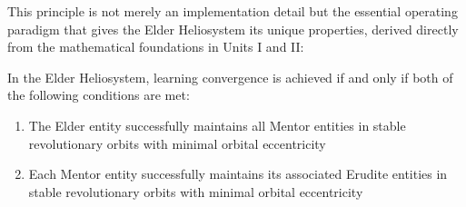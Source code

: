 This principle is not merely an implementation detail but the essential operating paradigm that gives the Elder Heliosystem its unique properties, derived directly from the mathematical foundations in Units I and II:

\begin{theorem}
\label{thm:gravitational_stability}
In the Elder Heliosystem, learning convergence is achieved if and only if both of the following conditions are met:
\begin{enumerate}
    \item The Elder entity successfully maintains all Mentor entities in stable revolutionary orbits with minimal orbital eccentricity
    \item Each Mentor entity successfully maintains its associated Erudite entities in stable revolutionary orbits with minimal orbital eccentricity
\end{enumerate}
\end{theorem}

